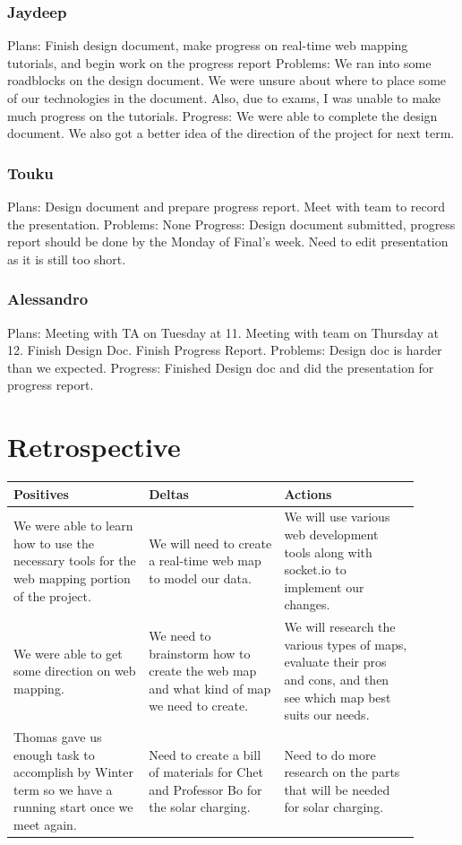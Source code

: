 \documentclass[onecolumn, draftclsnofoot,10pt, compsoc]{IEEEtran}
\begin{document}
\subsubsection{Jaydeep}
Plans: Finish design document, make progress on real-time web mapping tutorials, and  begin work on the progress report 
\newline
Problems: We ran into some roadblocks on the design document. We were unsure about where to place some of our technologies in the document. Also, due to exams, I was unable to make much progress on the tutorials.
\newline
Progress: We were able to complete the design document. We also got a better idea of the direction of the project for next term. 

\subsubsection{Touku}
Plans: Design document and prepare progress report.  Meet with team to record the presentation.
\newline
Problems: None
\newline
Progress: Design document submitted, progress report should be done by the Monday of Final’s week.  Need to edit presentation as it is still too short.

\subsubsection{Alessandro}
Plans: 	Meeting with TA on Tuesday at 11. Meeting with team on Thursday at 12. Finish Design Doc. Finish Progress Report.
\newline
Problems: Design doc is harder than we expected. 
\newline
Progress: Finished Design doc and did the presentation for progress report. 

\section{Retrospective}
\begin{tabular}{ |p{0.3\linewidth}|p{0.3\linewidth}|p{0.3\linewidth}|  }
\hline
Positives & Deltas & Actions\\
\hline
We were able to learn how to use the necessary tools for the web mapping portion of the project. & We will need to create a real-time web map to model our data. & We will use various web development tools along with socket.io to implement our changes. \\
\hline
We were able to get some direction on web mapping. & We need to brainstorm how to create the web map and what kind of map we need to create.& We will research the various types of maps, evaluate their pros and cons, and then see which map best suits our needs.\\
\hline
Thomas gave us enough task to accomplish by Winter term so we have a running start once we meet again.& Need to create a bill of materials for Chet and Professor Bo for the solar charging.& Need to do more research on the parts that will be needed for solar charging.\\
\hline
\end{tabular}
\end{document}
